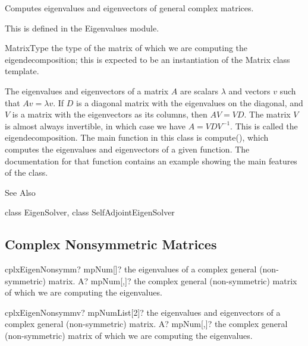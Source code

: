 Computes eigenvalues and eigenvectors of general complex matrices. 

This is defined in the Eigenvalues module.

MatrixType the type of the matrix of which we are computing the eigendecomposition; this is expected to be an instantiation of the Matrix class template. 

The eigenvalues and eigenvectors of a matrix $A$ are scalars $\lambda$ and vectors $v$ such that $A v = \lambda v$. If $D$ is a diagonal matrix with the eigenvalues on the diagonal, and $V$ is a matrix with the eigenvectors as its columns, then $A V = V D$. The matrix $V$ is almost always invertible, in which case we have $A=V D V^{-1}$. This is called the eigendecomposition.
The main function in this class is compute(), which computes the eigenvalues and eigenvectors of a given function. The documentation for that function contains an example showing the main features of the class.

See Also

class EigenSolver, class SelfAdjointEigenSolver 


\subsection{Complex Nonsymmetric Matrices}



\begin{mpFunctionsExtract}
	\mpFunctionOne
	{cplxEigenNonsymm? mpNum[]? the eigenvalues of a complex general (non-symmetric) matrix.}
	{A? mpNum[,]? the complex general (non-symmetric) matrix of which we are computing the eigenvalues.}
\end{mpFunctionsExtract}

\vspace{0.6cm}
\begin{mpFunctionsExtract}
	\mpFunctionOne
	{cplxEigenNonsymmv? mpNumList[2]? the eigenvalues and eigenvectors of a complex general (non-symmetric) matrix.}
	{A? mpNum[,]? the complex general (non-symmetric) matrix of which we are computing the eigenvalues.}
\end{mpFunctionsExtract}

%

